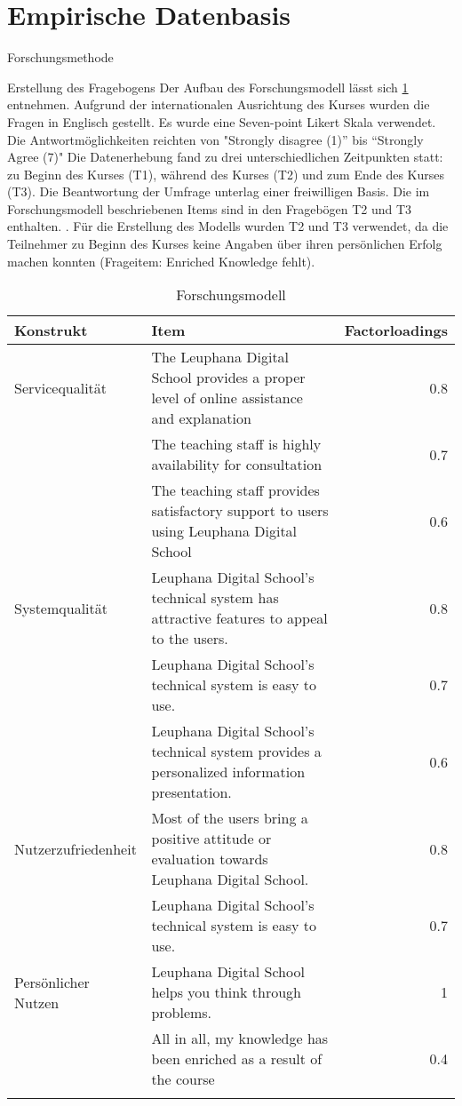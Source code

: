 \section{Empirische Datenbasis}
\label{sec:emp_daten}

Forschungsmethode

Erstellung des Fragebogens
Der Aufbau des Forschungsmodell lässt sich \ref{tab:Forschungsmodell} entnehmen. Aufgrund der internationalen Ausrichtung des Kurses wurden die Fragen in Englisch gestellt. 
Es wurde eine Seven-point Likert Skala verwendet. Die Antwortmöglichkeiten reichten von "Strongly disagree (1)” bis “Strongly Agree (7)"  
Die Datenerhebung fand zu drei unterschiedlichen Zeitpunkten statt: zu Beginn des Kurses (T1), während des Kurses (T2) und zum Ende des Kurses (T3). Die Beantwortung der Umfrage unterlag einer freiwilligen Basis. Die im Forschungsmodell beschriebenen Items sind in den Fragebögen T2 und T3 enthalten. .
Für die Erstellung des Modells wurden T2 und T3 verwendet, da die Teilnehmer zu Beginn des Kurses keine Angaben über ihren persönlichen Erfolg machen konnten (Frageitem: Enriched Knowledge fehlt). 
 

\begin{table}[ht] 
\footnotesize
\caption{Forschungsmodell}
\label{tab:Forschungsmodell} 
\begin{tabular}{@{}lp{10cm}r@{}} \toprule

\textbf{Konstrukt} & \textbf{Item} & \textbf{Factorloadings} \\ \midrule

Servicequalität & The Leuphana Digital School provides a proper level of online assistance and explanation & 0.8\\ 
& The teaching staff is highly availability for consultation & 0.7 \\
& The teaching staff provides satisfactory support to users using Leuphana Digital School & 0.6 \\ 
Systemqualität & Leuphana Digital School’s technical system has attractive features to appeal to the users. & 0.8\\ 
& Leuphana Digital School’s technical system is easy to use. & 0.7 \\
& Leuphana Digital School’s technical system provides a personalized information presentation. & 0.6 \\ 
Nutzerzufriedenheit & Most of the users bring a positive attitude or evaluation towards Leuphana Digital School. & 0.8\\ 
& Leuphana Digital School’s technical system is easy to use. & 0.7 \\ 
Persönlicher Nutzen & Leuphana Digital School helps you think through problems.  & 1\\ 
& All in all, my knowledge has been enriched as a result of the course & 0.4 \\ \addlinespace 
  \bottomrule

\end{tabular}	
\end{table}


